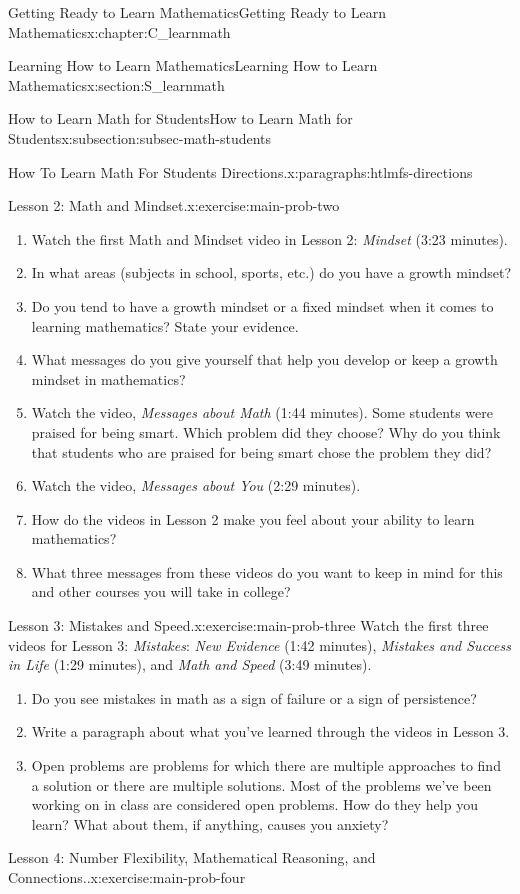 \documentclass[oneside,10pt,]{book}
\newcommand{\pubtitle}[1]{\textsl{#1}}
\numberwithin{equation}{chapter}
\begin{document}
\begin{chapterptx}{Getting Ready to Learn Mathematics}{}{Getting Ready to Learn Mathematics}{}{}{x:chapter:C_learnmath}
\begin{sectionptx}{Learning How to Learn Mathematics}{}{Learning How to Learn Mathematics}{}{}{x:section:S_learnmath}
\begin{subsectionptx}{How to Learn Math for Students}{}{How to Learn Math for Students}{}{}{x:subsection:subsec-math-students}
\begin{paragraphs}{How To Learn Math For Students Directions.}{x:paragraphs:htlmfs-directions}
\begin{inlineexercise}{Lesson 2: Math and Mindset.}{x:exercise:main-prob-two}
\begin{enumerate}[font=\bfseries,label=(\alph*),ref=\alph*]
\item{}Watch the first Math and Mindset video in Lesson 2: \pubtitle{Mindset} (3:23 minutes).%
\item{}In what areas (subjects in school, sports, etc.) do you have a growth mindset?%
\item{}Do you tend to have a growth mindset or a fixed mindset when it comes to learning mathematics? State your evidence.%
\item{}What messages do you give yourself that help you develop or keep a growth mindset in mathematics?%
\item{}Watch the video, \pubtitle{Messages about Math} (1:44 minutes). Some students were praised for being smart. Which problem did they choose? Why do you think that students who are praised for being smart chose the problem they did?%
\item{}Watch the video, \pubtitle{Messages about You} (2:29 minutes).%
\item{}How do the videos in Lesson 2 make you feel about your ability to learn mathematics?%
\item{}What three messages from these videos do you want to keep in mind for this and other courses you will take in college?%
\end{enumerate}
\end{inlineexercise}%
\begin{inlineexercise}{Lesson 3: Mistakes and Speed.}{x:exercise:main-prob-three}%
Watch the first three videos for Lesson 3: \pubtitle{Mistakes}: \pubtitle{New Evidence} (1:42 minutes), \pubtitle{Mistakes and Success in Life} (1:29 minutes), and \pubtitle{Math and Speed} (3:49 minutes).%
\begin{enumerate}[font=\bfseries,label=(\alph*),ref=\alph*]
\item{}Do you see mistakes in math as a sign of failure or a sign of persistence?%
\item{}Write a paragraph about what you've learned through the videos in Lesson 3.%
\item{}Open problems are problems for which there are multiple approaches to find a solution or there are multiple solutions. Most of the problems we've been working on in class are considered open problems. How do they help you learn?  What about them, if anything, causes you anxiety?%
\end{enumerate}
\end{inlineexercise}%
\begin{inlineexercise}{Lesson 4: Number Flexibility, Mathematical Reasoning, and Connections..}{x:exercise:main-prob-four}%

\end{inlineexercise}
\end{paragraphs}
\end{subsectionptx}
\end{sectionptx}
\end{chapterptx}
\end{document}
